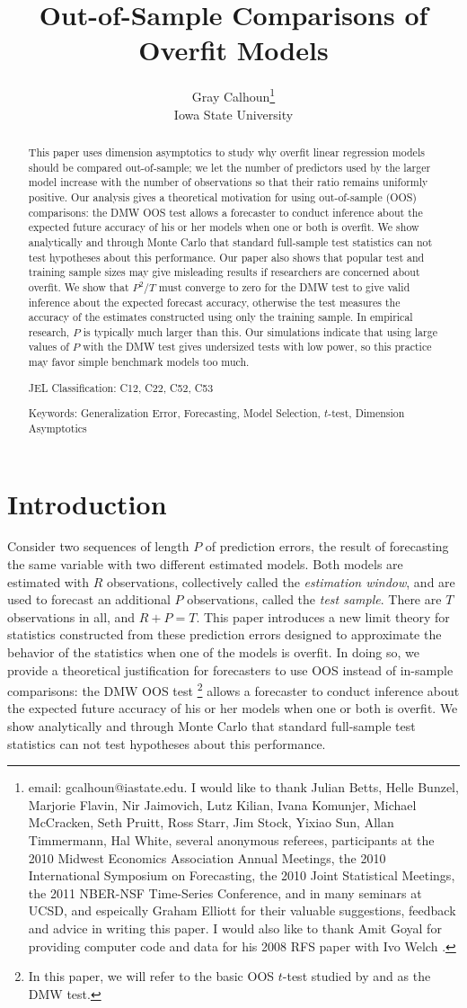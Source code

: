 \documentclass[12pt]{article}
\title{Out-of-Sample Comparisons of Overfit Models}
\author{Gray Calhoun\thanks{email: gcalhoun@iastate.edu. I
    would like to thank Julian Betts, Helle Bunzel, Marjorie Flavin,
    Nir Jaimovich, Lutz Kilian, Ivana Komunjer, Michael McCracken,
    Seth Pruitt, Ross Starr, Jim Stock, Yixiao Sun, Allan Timmermann,
    Hal White, several anonymous referees, participants at the 2010
    Midwest Economics Association Annual Meetings, the 2010
    International Symposium on Forecasting, the 2010 Joint Statistical
    Meetings, the 2011 NBER-NSF Time-Series
    Conference, and in many seminars at UCSD, and espeically
    Graham Elliott for their valuable suggestions, feedback and advice
    in writing this paper.  I would also like to thank Amit Goyal for
    providing computer code and data for his 2008 RFS paper
    with Ivo Welch \citep{GoW:08}.} \\ Iowa State University}
\begin{document}
\maketitle

\begin{abstract}\noindent
  This paper uses dimension asymptotics to study why overfit linear
  regression models should be compared out-of-sample; we let the
  number of predictors used by the larger model increase with the
  number of observations so that their ratio remains uniformly
  positive.  Our analysis gives a theoretical motivation for using
  out-of-sample (OOS) comparisons: the DMW OOS test allows a forecaster to
  conduct inference about the expected future accuracy of his or her
  models when one or both is overfit.  We show analytically and
  through Monte Carlo that standard full-sample test statistics can
  not test hypotheses about this performance.  Our paper also shows
  that popular test and training sample sizes may give misleading
  results if researchers are concerned about overfit.  We show that
  $P^2/T$ must converge to zero for the DMW test to give valid
  inference about the expected forecast accuracy, otherwise the test
  measures the accuracy of the estimates constructed using only the
  training sample.  In empirical research, $P$ is typically much
  larger than this.  Our simulations indicate that using large values
  of $P$ with the DMW test gives undersized tests with low power, so
  this practice may favor simple benchmark models too much.

\noindent JEL Classification: C12, C22, C52, C53

\noindent Keywords: Generalization Error, Forecasting, Model
Selection, $t$-test, Dimension Asymptotics
\end{abstract}
\newpage

\section{Introduction}
\label{sec:introduction}

Consider two sequences of length $P$ of prediction errors, the result
of forecasting the same variable with two different estimated models.
Both models are estimated with $R$ observations, collectively called
the {\em estimation window}, and are used to forecast an additional
$P$ observations, called the {\em test sample}.  There are $T$
observations in all, and $R+P=T$.  This paper introduces a new limit
theory for statistics constructed from these prediction errors
designed to approximate the behavior of the statistics when one of the
models is overfit.  In doing so, we provide a theoretical
justification for forecasters to use OOS instead of in-sample
comparisons: the DMW OOS test%
\footnote{In this paper, we will refer to the basic OOS $t$-test
  studied by \citet{DiM:95} and \citet{Wes:96} as the DMW test.} %
allows a forecaster to conduct
inference about the expected future accuracy of his or her models when
one or both is overfit.  We show analytically and through Monte Carlo
that standard full-sample test statistics can not test hypotheses
about this performance.
\end{document}
